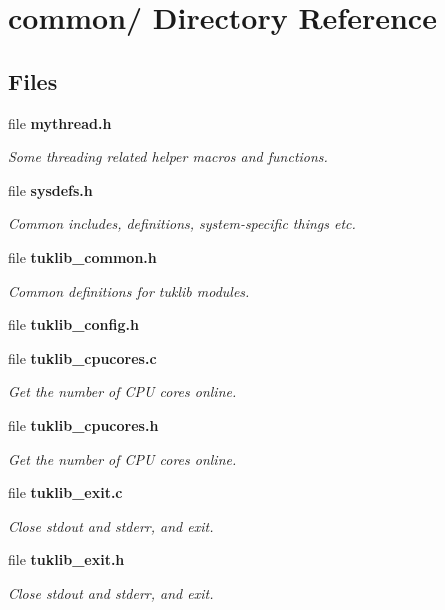 \section{common/ Directory Reference}
\label{dir_bdd9a5d540de89e9fe90efdfc6973a4f}
\subsection*{Files}
\begin{DoxyCompactItemize}
\item 
file {\bf mythread.\-h}
\begin{DoxyCompactList}\small\item\em Some threading related helper macros and functions. \end{DoxyCompactList}\item 
file {\bf sysdefs.\-h}
\begin{DoxyCompactList}\small\item\em Common includes, definitions, system-\/specific things etc. \end{DoxyCompactList}\item 
file {\bf tuklib\-\_\-common.\-h}
\begin{DoxyCompactList}\small\item\em Common definitions for tuklib modules. \end{DoxyCompactList}\item 
file {\bfseries tuklib\-\_\-config.\-h}
\item 
file {\bf tuklib\-\_\-cpucores.\-c}
\begin{DoxyCompactList}\small\item\em Get the number of C\-P\-U cores online. \end{DoxyCompactList}\item 
file {\bf tuklib\-\_\-cpucores.\-h}
\begin{DoxyCompactList}\small\item\em Get the number of C\-P\-U cores online. \end{DoxyCompactList}\item 
file {\bf tuklib\-\_\-exit.\-c}
\begin{DoxyCompactList}\small\item\em Close stdout and stderr, and exit. \end{DoxyCompactList}\item 
file {\bf tuklib\-\_\-exit.\-h}
\begin{DoxyCompactList}\small\item\em Close stdout and stderr, and exit. \end{DoxyCompactList}\item 

\end{DoxyCompactItemize}

